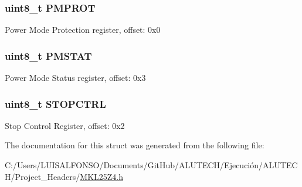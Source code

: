 \subsubsection[{P\+M\+P\+R\+O\+T}]{\setlength{\rightskip}{0pt plus 5cm}uint8\+\_\+t P\+M\+P\+R\+O\+T}\label{struct_s_m_c___mem_map_a0e48ca7c949ba2fd2f9a29f153ee1245}
Power Mode Protection register, offset\+: 0x0 \hypertarget{struct_s_m_c___mem_map_adacbe2d7cc2808682b7b83e091b850a8}{}
\subsubsection[{P\+M\+S\+T\+A\+T}]{\setlength{\rightskip}{0pt plus 5cm}uint8\+\_\+t P\+M\+S\+T\+A\+T}\label{struct_s_m_c___mem_map_adacbe2d7cc2808682b7b83e091b850a8}
Power Mode Status register, offset\+: 0x3 \hypertarget{struct_s_m_c___mem_map_a2873244428756490bbc28c84e2161d73}{}
\subsubsection[{S\+T\+O\+P\+C\+T\+R\+L}]{\setlength{\rightskip}{0pt plus 5cm}uint8\+\_\+t S\+T\+O\+P\+C\+T\+R\+L}\label{struct_s_m_c___mem_map_a2873244428756490bbc28c84e2161d73}
Stop Control Register, offset\+: 0x2 

The documentation for this struct was generated from the following file\+:\begin{DoxyCompactItemize}
\item 
C\+:/\+Users/\+L\+U\+I\+S\+A\+L\+F\+O\+N\+S\+O/\+Documents/\+Git\+Hub/\+A\+L\+U\+T\+E\+C\+H/\+Ejecución/\+A\+L\+U\+T\+E\+C\+H/\+Project\+\_\+\+Headers/\hyperlink{_m_k_l25_z4_8h}{M\+K\+L25\+Z4.\+h}\end{DoxyCompactItemize}
